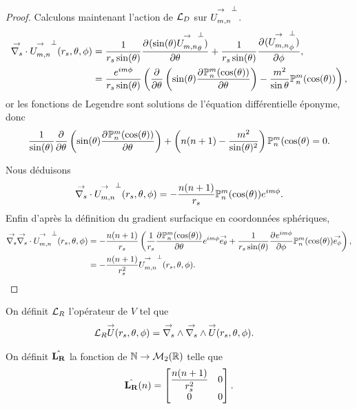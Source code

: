 \begin{proof}
      Calculons maintenant l'action de \({\mathcal{L}_D}\) sur \({\overset{\rightarrow}{U_{m,n}^{{}}}}^\perp\).
      \begin{align*}
        {\overset{\rightarrow}{\nabla_s}} \cdot{}{\overset{\rightarrow}{U_{m,n}^{{}}}}^\perp(r_s,\theta,\phi) &= \dfrac{1}{r_s\sin(\theta)} \dfrac{\partial^{{}} (\sin(\theta){\overset{\rightarrow}{U_{m,n}^{{}}}}^\perp_\theta)}{{\partial \theta}^{{}}} + \dfrac{1}{r_s\sin(\theta)}\dfrac{\partial^{{}} ({\overset{\rightarrow}{U_{m,n}^{{}}}}^\perp_\phi)}{{\partial \phi}^{{}}},
        \\
        &= \dfrac{e^{im\phi}}{r_s\sin(\theta)}
        \left(
          \dfrac{\partial^{{}} }{{\partial \theta}^{{}}}\left(\sin(\theta)\dfrac{\partial^{{}} \mathbb{P}^m_n(\cos(\theta))}{{\partial \theta}^{{}}}\right) - \dfrac{m^2}{\sin\theta}\mathbb{P}^m_n(\cos(\theta))
        \right),
      \end{align*}
      or les fonctions de Legendre sont solutions de l'équation différentielle éponyme, donc
      \begin{align*}
        \dfrac{1}{\sin(\theta)}\dfrac{\partial^{{}} }{{\partial \theta}^{{}}}\left(\sin(\theta)\dfrac{\partial^{{}} \mathbb{P}^m_n(\cos(\theta))}{{\partial \theta}^{{}}}\right) + \left(n(n+1)-\dfrac{m^2}{\sin(\theta)^2}\right)\mathbb{P}^m_n(\cos(\theta) = 0.
      \end{align*}

      Nous déduisons 
      \begin{align*}
         {\overset{\rightarrow}{\nabla_s}} \cdot{}{\overset{\rightarrow}{U_{m,n}^{{}}}}^\perp(r_s,\theta,\phi) = -\dfrac{n(n+1)}{r_s}\mathbb{P}^m_n(\cos(\theta))e^{im\phi}.
      \end{align*}
      Enfin d’après la définition du gradient surfacique en coordonnées sphériques,
      \begin{align*}
         {\overset{\rightarrow}{\nabla_s}}{}{\overset{\rightarrow}{\nabla_s}} \cdot{}{\overset{\rightarrow}{U_{m,n}^{{}}}}^\perp(r_s,\theta,\phi) &= -\dfrac{n(n+1)}{r_s}\left(\dfrac{1}{r_s}\dfrac{\partial^{{}} \mathbb{P}^m_n(\cos(\theta))}{{\partial \theta}^{{}}}e^{im\phi}{\overset{\rightarrow}{e_\theta}}+\dfrac{1}{r_s\sin(\theta)}\dfrac{\partial^{{}} e^{im\phi}}{{\partial \phi}^{{}}}\mathbb{P}^m_n(\cos(\theta)){\overset{\rightarrow}{e_\phi}}\right),
         \\
         &=-\dfrac{n(n+1)}{r_s^2}{\overset{\rightarrow}{U_{m,n}^{{}}}}^\perp(r_s,\theta,\phi).
      \end{align*}
    \end{proof}


    \begin{defn}
      \label{eq:sphere:fourier:LR}
      On définit \({\mathcal{L}_R}\) l'opérateur de \(V\) tel que
      \begin{align*}
        {\mathcal{L}_R} {\overset{\rightarrow}{U}}(r_s,\theta,\phi) & = {\overset{\rightarrow}{\nabla_s}} \wedge{} {\overset{\rightarrow}{\nabla_s}} \wedge{} {\overset{\rightarrow}{U}}(r_s,\theta,\phi).
      \end{align*}

      On définit \(\hat{\mathbf{L_R}}\) la fonction de \(\mathbb N \rightarrow \mathcal{M}_2(\mathbb R)\) telle que
      \begin{equation*}
        \hat{\mathbf{L_R}}(n) =
        \begin{bmatrix}
          \dfrac{n(n+1)}{r_s^2} & 0
          \\
          0 & 0
        \end{bmatrix}.
      \end{equation*}
    \end{defn}

